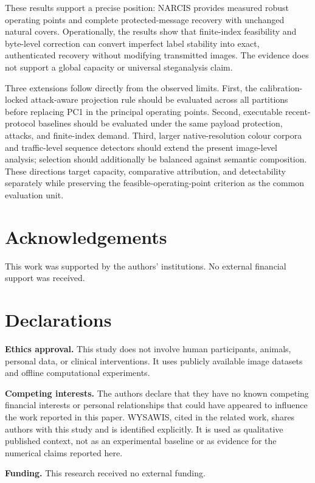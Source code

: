 ﻿\documentclass[a4paper,fleqn]{cas-dc}
\begin{document}
These results support a precise position: NARCIS provides measured robust
operating points and complete protected-message recovery with unchanged
natural covers. Operationally, the results show that finite-index feasibility
and byte-level correction can convert imperfect label stability into exact,
authenticated recovery without modifying transmitted images. The evidence
does not support a global capacity or universal steganalysis claim.

Three extensions follow directly from the observed limits. First, the
calibration-locked attack-aware projection rule should be evaluated across
all partitions before replacing PC1 in the principal operating points.
Second, executable recent-protocol
baselines should be evaluated under the same payload protection, attacks, and
finite-index demand. Third, larger native-resolution colour corpora and
traffic-level sequence detectors should extend the present image-level
analysis; selection should additionally be balanced against semantic
composition. These directions target capacity, comparative attribution, and
detectability separately while preserving the feasible-operating-point
criterion as the common evaluation unit.

\section*{Acknowledgements}
This work was supported by the authors' institutions. No external financial
support was received.

\printcredits

\section*{Declarations}
\noindent\textbf{Ethics approval.}
This study does not involve human participants, animals, personal data, or
clinical interventions. It uses publicly available image datasets and offline
computational experiments.

\medskip
\noindent\textbf{Competing interests.}
The authors declare that they have no known competing financial interests or
personal relationships that could have appeared to influence the work
reported in this paper. WYSAWIS, cited in the related work, shares authors
with this study and is identified explicitly. It is used as qualitative
published context, not as an experimental baseline or as evidence for the
numerical claims reported here.

\medskip
\noindent\textbf{Funding.}
This research received no external funding.
\end{document}
